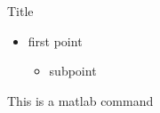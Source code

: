 \documentclass{beamer}
\begin{document}
\begin{frame}[fragile]{Title}
\begin{itemize}[<+->]
    \item first point
    \begin{itemize}[<+->]
        \item subpoint
    \end{itemize}
\end{itemize}
\begin{myMPcolor}
This is a matlab command
\end{myMPcolor}
\end{frame}
\end{document}
